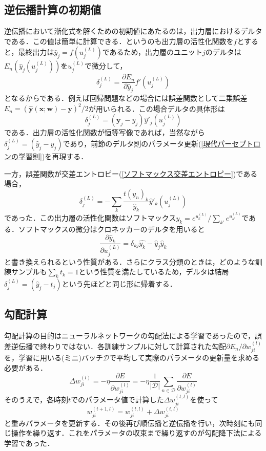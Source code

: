 \documentclass[a4paper,11pt]{jsreport}
\begin{document}
\subsection{逆伝播計算の初期値}
逆伝播において漸化式を解くための初期値にあたるのは，出力層におけるデルタである．この値は簡単に計算できる．というのも出力層の活性化関数を$f$とすると，最終出力は$\hat{y}_j=f(u_j^{(L)})$であるため，出力層のユニット$j$のデルタは$E_n(\hat{y}_j(u_j^{(L)}))$を$u_j^{(L)}$で微分して，
\begin{equation}
  \delta_j^{(L)}
  = \frac{\partial E_n}{\partial \hat{y}_j} f'(u_j^{(L)})
\end{equation}
となるからである．例えば回帰問題などの場合には誤差関数として二乗誤差$E_n=(\hat{\bm{y}}(\bm{x};\bm{w})-\bm{y})^2/2$が用いられる．この場合デルタの具体形は
\begin{equation}
  \delta_j^{(L)} = (\bm{y}_j - y_j)\hat{y}'_j (u_j^{(L)})
\end{equation}
である．出力層の活性化関数が恒等写像であれば，当然ながら$\delta_j^{(L)}=(\hat{y}_j-y_j)$であり，前節のデルタ則のパラメータ更新(\ref{現代パーセプトロンの学習則})を再現する．\par
一方，誤差関数が交差エントロピー(\ref{ソフトマックス交差エントロピー})である場合，
\begin{equation}
  \delta_j^{(L)}
  = -\sum_k \frac{t(y_n)_k}{\hat{y}_k}\hat{y}'_k(u_j^{(L)})
\end{equation}
であった．この出力層の活性化関数はソフトマックス$y_k = e^{u_k^{(L)}}/\sum_{k'}e^{u_{k'}^{(L)}}$である．ソフトマックスの微分はクロネッカーのデルタを用いると
\begin{equation}
  \frac{\partial \hat{y}_k}{\partial u_j^{(L)}}
  = \delta_{kj} \hat{y_k} - \hat{y}_j \hat{y}_k
\end{equation}
と書き換えられるという性質がある．さらにクラス分類のときは，どのような訓練サンプルも$\sum_kt_k=1$という性質を満たしているため，デルタは結局$\delta_j^{(L)}=(\hat{y}_j - t_j)$という先ほどと同じ形に帰着する．

\subsection{勾配計算}
勾配計算の目的はニューラルネットワークの勾配法による学習であったので，誤差逆伝播で終わりではない．各訓練サンプルに対して計算された勾配$\partial E_n/\partial w_{ji}^{(l)}$を，学習に用いる(ミニ)バッチ$\mathcal{D}$で平均して実際のパラメータの更新量を求める必要がある．
\begin{equation}
  \Delta w_{ji}^{(l)}
  = -\eta \frac{\partial E}{\partial w_{ji}^{(l)}}
  = -\eta \frac{1}{|\mathcal{D}|} \sum_{n \in \mathcal{D}}\frac{\partial E}{\partial w_{ji}^{(l)}}
\end{equation}
そのうえで，各時刻$t$でのパラメータ値で計算した$\Delta w_{ji}^{(t,l)}$を使って
\begin{equation}
  w_{ji}^{(t+1,l)}
  = w_{ji}^{(t,l)} + \Delta w_{ji}^{(t,l)}
\end{equation}
と重みパラメータを更新する．その後再び順伝播と逆伝播を行い，次時刻にも同じ操作を繰り返す．これをパラメータの収束まで繰り返すのが勾配降下法による学習であった．
\end{document}
